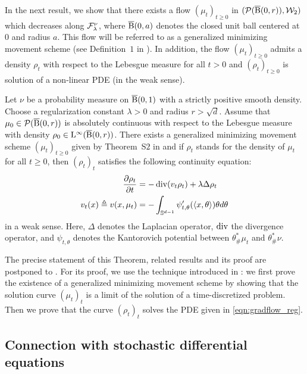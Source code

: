 In the next result, we show that there exists a flow $(\mu_t)_{t\geq0}$ in $({\cal P}(\operatorname{\overline{B}}(0,r)),{\cal W}_2)$ which decreases along ${\cal F}_\lambda^\nu$, where $\operatorname{\overline{B}}(0,a)$ denotes the closed unit ball centered at $0$ and radius $a$. This flow will be referred to as a generalized minimizing movement scheme (see Definition~$1$ in \supp).  In addition, the flow $(\mu_t)_{t \geq 0}$ admits a density $\rho_t$ with respect to the Lebesgue measure for all $t>0$ and $(\rho_t)_{t \geq 0}$ is solution of a non-linear PDE (in the weak sense). %
%
%
\begin{thm}
\label{thm:continuity}
Let $\nu$ be a probability measure on $\operatorname{\overline{B}}(0,1)$ with a strictly positive smooth density. Choose a regularization constant $\lambda > 0$ and radius $r > \sqrt{d}$. Assume that $\mu_0 \in \mathcal{P}(\operatorname{\overline{B}}(0,r))$ is absolutely continuous with respect to the Lebesgue measure with density $\rho_0 \in \mathrm{L}^{\infty}(\operatorname{\overline{B}}(0,r))$. There exists a generalized minimizing movement scheme  $(\mu_t)_{t \geq 0}$ given by Theorem~S$2$ in \supp and if $\rho_t$ stands for the density of $\mu_t$ for all $t \geq 0$, then $(\rho_t)_t$ satisfies the following continuity equation:
\begin{align}
\frac{\partial \rho_t}{\partial t}   &= -\operatorname{div} (v_t \rho_t) + \lambda \Delta \rho_t\\
 v_t(x) \triangleq v(x,\mu_t) &= - \int_{\mathbb{S}^{d-1}} \psi_{t, \theta}'(\langle x , \theta \rangle ) \theta d\theta  \label{eqn:gradflow_reg}
\end{align}
in a weak sense. Here, $\Delta$ denotes the Laplacian operator, $\operatorname{div}$ the divergence operator, and $\psi_{t,\theta}$ denotes the Kantorovich potential between $\theta^*_{\#}\mu_t$ and $\theta^*_{\#}\nu$.
\end{thm}
The precise statement of this Theorem, related results and its proof are postponed to \supp. For its proof, we use the technique introduced in \cite{jordan1998variational}: we first prove the existence of a generalized minimizing movement scheme by showing that the solution curve $(\mu_t)_t$ is a limit of the solution of a time-discretized problem. Then we prove that the curve $(\rho_t)_t$ solves the PDE given in \eqref{eqn:gradflow_reg}.





\subsection{Connection with stochastic differential equations}

